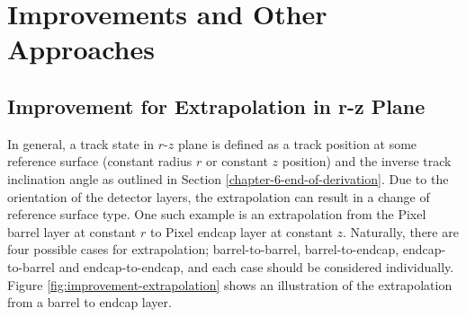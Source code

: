











\section{Improvements and Other Approaches}



\subsection{Improvement for Extrapolation in r-z Plane}

In general, a track state in $r$-$z$ plane is defined as a track position at some reference surface (constant radius $r$ or constant $z$ position) and the inverse track inclination angle as outlined in Section \ref{chapter-6-end-of-derivation}. Due to the orientation of the detector layers, the extrapolation can result in a change of reference surface type. One such example is an extrapolation from the Pixel barrel layer at constant $r$ to Pixel endcap layer at constant $z$. Naturally, there are four possible cases for extrapolation; barrel-to-barrel, barrel-to-endcap, endcap-to-barrel and endcap-to-endcap, and each case should be considered individually. Figure \ref{fig:improvement-extrapolation} shows an illustration of the extrapolation from a barrel to endcap layer.


